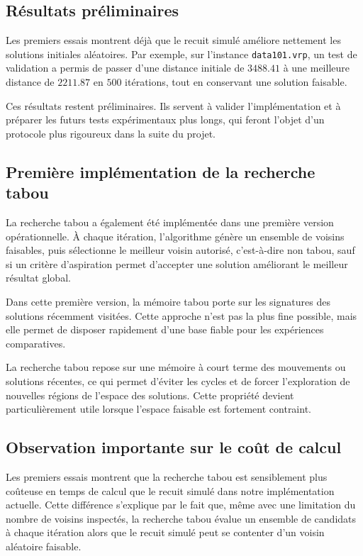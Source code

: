 \documentclass[11pt,a4paper]{article}
\begin{document}
\subsection{Résultats préliminaires}
Les premiers essais montrent déjà que le recuit simulé améliore nettement les solutions initiales aléatoires. Par exemple, sur l'instance \texttt{data101.vrp}, un test de validation a permis de passer d'une distance initiale de \(3488.41\) à une meilleure distance de \(2211.87\) en \(500\) itérations, tout en conservant une solution faisable.

Ces résultats restent préliminaires. Ils servent à valider l'implémentation et à préparer les futurs tests expérimentaux plus longs, qui feront l'objet d'un protocole plus rigoureux dans la suite du projet.

\subsection{Première implémentation de la recherche tabou}
La recherche tabou a également été implémentée dans une première version opérationnelle. À chaque itération, l'algorithme génère un ensemble de voisins faisables, puis sélectionne le meilleur voisin autorisé, c'est-à-dire non tabou, sauf si un critère d'aspiration permet d'accepter une solution améliorant le meilleur résultat global.

Dans cette première version, la mémoire tabou porte sur les signatures des solutions récemment visitées. Cette approche n'est pas la plus fine possible, mais elle permet de disposer rapidement d'une base fiable pour les expériences comparatives.

La recherche tabou repose sur une mémoire à court terme des mouvements ou solutions récentes, ce qui permet d'éviter les cycles et de forcer l'exploration de nouvelles régions de l'espace des solutions. Cette propriété devient particulièrement utile lorsque l'espace faisable est fortement contraint.

\subsection{Observation importante sur le coût de calcul}
Les premiers essais montrent que la recherche tabou est sensiblement plus coûteuse en temps de calcul que le recuit simulé dans notre implémentation actuelle. Cette différence s'explique par le fait que, même avec une limitation du nombre de voisins inspectés, la recherche tabou évalue un ensemble de candidats à chaque itération alors que le recuit simulé peut se contenter d'un voisin aléatoire faisable.
\end{document}
